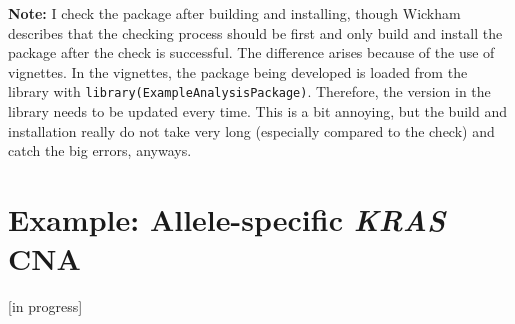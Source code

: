 \documentclass[]{book}
\begin{document}
\textbf{Note:} I check the package after building and installing, though Wickham describes that the checking process should be first and only build and install the package after the check is successful. The difference arises because of the use of vignettes. In the vignettes, the package being developed is loaded from the library with \texttt{library(ExampleAnalysisPackage)}. Therefore, the version in the library needs to be updated every time. This is a bit annoying, but the build and installation really do not take very long (especially compared to the check) and catch the big errors, anyways.

\hypertarget{example-allele-specific-kras-cna}{%
\chapter{\texorpdfstring{Example: Allele-specific \emph{KRAS} CNA}{Example: Allele-specific KRAS CNA}}\label{example-allele-specific-kras-cna}}

{[}in progress{]}


\end{document}
